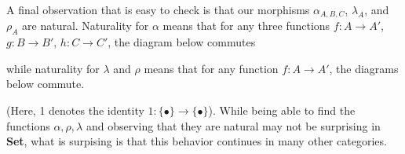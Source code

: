 \begin{example}
    A final observation that is easy to check is that our morphisms $\alpha_{A, B, C}$, $\lambda_A$, and $\rho_A$ are natural. 
    Naturality for $\alpha$ means that 
    for any three functions $f: A \to A'$, $g: B \to B'$, $h: C \to C'$, the 
    diagram below commutes 
    \begin{center}
    \end{center}
    while naturality for $\lambda$ and $\rho$ means that for any function $f: A \to A'$, the diagrams 
    below commute. 
    \begin{center}
        \hspace{1cm}
    \end{center}
    (Here, 1 denotes the identity $1: \{\bullet\} \to \{\bullet\}$). While being able to find 
    the functions $\alpha, \rho, \lambda$ and observing that they are natural 
    may not be surprising in \textbf{Set}, what is surpising is that this behavior continues in 
    many other categories. 
\end{example}

